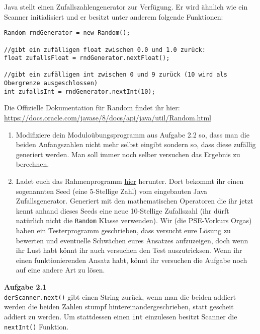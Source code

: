 \documentclass{../../sheet}
\begin{document}
\newpage
{}
Java stellt einen Zufallszahlengenerator zur Verfügung. Er wird ähnlich wie ein Scanner initialisiert und er besitzt unter anderem folgende Funktionen:

\begin{verbatim}
Random rndGenerator = new Random();

//gibt ein zufälligen float zwischen 0.0 und 1.0 zurück:
float zufallsFloat = rndGenerator.nextFloat();

//gibt ein zufälligen int zwischen 0 und 9 zurück (10 wird als Obergrenze ausgeschlossen)
int zufallsInt = rndGenerator.nextInt(10);
\end{verbatim}
Die Offizielle Dokumentation für Random findet ihr hier: \url{https://docs.oracle.com/javase/8/docs/api/java/util/Random.html}

\begin{enumerate}
  \item Modifiziere dein Moduloübungsprogramm aus Aufgabe 2.2 so, dass man die beiden Anfangszahlen nicht mehr selbst eingibt sondern so, dass diese zufällig generiert werden. Man soll immer noch selber versuchen das Ergebnis zu berechnen.
  \item Ladet euch das Rahmenprogramm \href{https://fius.de/wp-content/uploads/2025/10/Day1Highperformer.zip}{hier} herunter. Dort bekommt ihr einen sogenannten Seed (eine 5-Stellige Zahl) vom eingebauten Java Zufallsgenerator. Generiert mit den mathematischen Operatoren die ihr jetzt kennt anhand dieses Seeds eine neue 10-Stellige Zufallszahl (ihr dürft natürlich nicht die \texttt{Random} Klasse verwenden). Wir (die PSE-Vorkurs Orgas) haben ein Testerprogramm geschrieben, dass versucht eure Lösung zu bewerten und eventuelle Schwächen eures Ansatzes aufzuzeigen, doch wenn ihr Lust habt könnt ihr auch versuchen den Test auszutricksen. Wenn ihr einen funktionierenden Ansatz habt, könnt ihr versuchen die Aufgabe noch auf eine andere Art zu lösen.
\end{enumerate}

\newpage
{}
\hypertarget{Aufgabe_2.1}{}
\textbf{Aufgabe 2.1}\\
\texttt{derScanner.next()} gibt einen String zurück, wenn man die beiden addiert werden die beiden Zahlen stumpf hintereinandergeschrieben, statt gescheit addiert zu werden. Um stattdessen einen \texttt{int} einzulesen besitzt Scanner die \texttt{nextInt()} Funktion.
\end{document}
